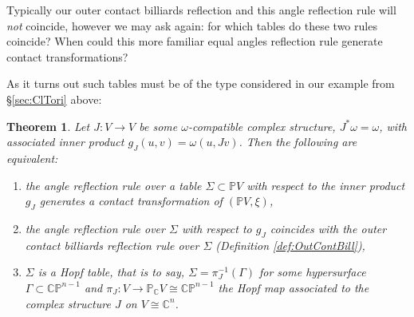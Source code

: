 \documentclass{article}
\newcommand{\C}{\mathbb{C}} %
\newtheorem{thm}{Theorem}[section]
\begin{document}
Typically our outer contact billiards reflection and this angle reflection rule will 
{\em not} coincide, however we may ask again: for which tables do these two rules 
coincide? When could this more familiar equal angles reflection rule generate contact 
transformations?

As it turns out such tables must be of the type considered in our example from \S \ref{sec:ClTori} above:

\begin{thm}\label{Thm:CplxTable}
    Let $J:V\to V$ be some $\omega$-compatible complex structure, $J^*\omega = \omega$,
    with associated inner product $g_J(u,v)= \omega(u,Jv)$. Then the following are 
    equivalent:
    \begin{enumerate}
        \item the angle reflection rule over a table $\Sigma\subset\mathbb{P}V$ with 
        respect to the inner product $g_J$ generates a contact transformation of 
        $(\mathbb{P}V,\xi)$,
        \item the angle reflection rule over $\Sigma$ with respect to $g_J$ coincides with 
        the outer contact billiards reflection rule over $\Sigma$ (Definition 
        \ref{def:OutContBill}),
        \item $\Sigma$ is a {\em Hopf table}, that is to say, $\Sigma = \pi_J^{-1}(\Gamma)$ 
        for some hypersurface $\Gamma\subset \mathbb{CP}^{n-1}$ and $\pi_J:V\to \mathbb{P}_\C V \cong \mathbb{CP}^{n-1}$ the Hopf map associated to the complex
        structure $J$ on $V\cong \C^n$.
    \end{enumerate}
\end{thm}
\end{document}
